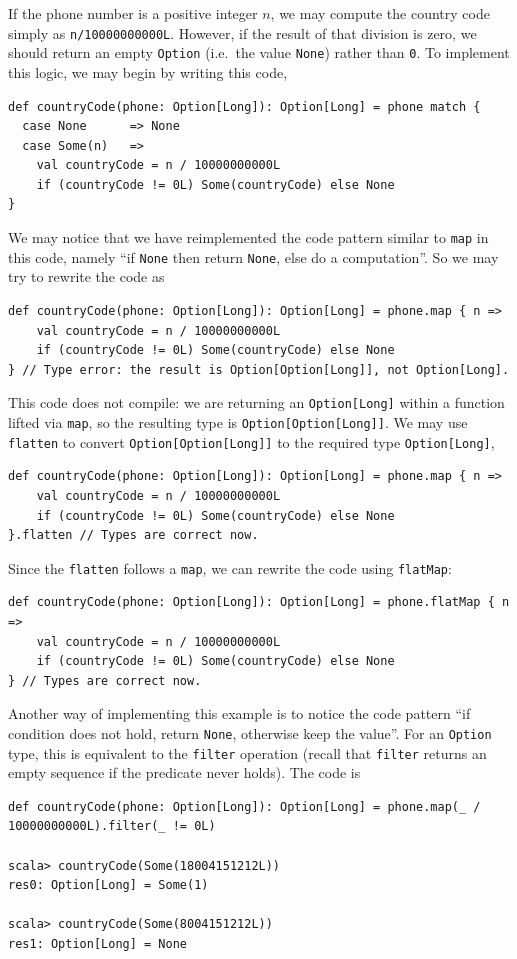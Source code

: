 If the phone number is a positive integer $n$, we may compute the
country code simply as \lstinline!n/10000000000L!. However, if the
result of that division is zero, we should return an empty \lstinline!Option!
(i.e.~the value \lstinline!None!) rather than \lstinline!0!. To
implement this logic, we may begin by writing this code,
\begin{lstlisting}
def countryCode(phone: Option[Long]): Option[Long] = phone match {
  case None      => None
  case Some(n)   =>
    val countryCode = n / 10000000000L
    if (countryCode != 0L) Some(countryCode) else None 
}
\end{lstlisting}
We may notice that we have reimplemented the code pattern similar
to \lstinline!map! in this code, namely ``if \lstinline!None! then
return \lstinline!None!, else do a computation''. So we may try
to rewrite the code as
\begin{lstlisting}
def countryCode(phone: Option[Long]): Option[Long] = phone.map { n =>
    val countryCode = n / 10000000000L
    if (countryCode != 0L) Some(countryCode) else None 
} // Type error: the result is Option[Option[Long]], not Option[Long].
\end{lstlisting}
This code does not compile: we are returning an \lstinline!Option[Long]!
within a function lifted via \lstinline!map!, so the resulting type
is \lstinline!Option[Option[Long]]!. We may use \lstinline!flatten!
to convert \lstinline!Option[Option[Long]]! to the required type
\lstinline!Option[Long]!,
\begin{lstlisting}
def countryCode(phone: Option[Long]): Option[Long] = phone.map { n =>
    val countryCode = n / 10000000000L
    if (countryCode != 0L) Some(countryCode) else None 
}.flatten // Types are correct now.
\end{lstlisting}
Since the \lstinline!flatten! follows a \lstinline!map!, we can
rewrite the code using \lstinline!flatMap!:
\begin{lstlisting}
def countryCode(phone: Option[Long]): Option[Long] = phone.flatMap { n =>
    val countryCode = n / 10000000000L
    if (countryCode != 0L) Some(countryCode) else None 
} // Types are correct now.
\end{lstlisting}
Another way of implementing this example is to notice the code pattern
``if condition does not hold, return \lstinline!None!, otherwise
keep the value''. For an \lstinline!Option! type, this is equivalent
to the \lstinline!filter! operation (recall that \lstinline!filter!
returns an empty sequence if the predicate never holds). The code
is
\begin{lstlisting}
def countryCode(phone: Option[Long]): Option[Long] = phone.map(_ / 10000000000L).filter(_ != 0L)

scala> countryCode(Some(18004151212L))
res0: Option[Long] = Some(1)

scala> countryCode(Some(8004151212L))
res1: Option[Long] = None
\end{lstlisting}


